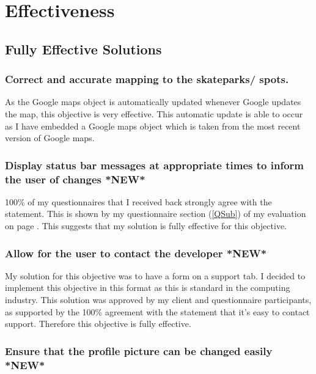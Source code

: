 \section{Effectiveness}

\subsection{Fully Effective Solutions}



	\subsubsection{Correct and accurate mapping to the skateparks/ spots.}

As the Google maps object is automatically updated whenever Google updates the map, this objective is very effective. This automatic update is able to occur as I have embedded a Google maps object which is taken from the most recent version of Google maps. 

	\subsubsection{Display status bar messages at appropriate times to inform the user of changes *NEW*}

100\% of my questionnaires that I received back strongly agree with the statement. This is shown by my questionnaire section (\ref{QSub}) of my evaluation on page \pageref{QSub}. This suggests that my solution is fully effective for this objective. 

	\subsubsection{Allow for the user to contact the developer *NEW*}

My solution for this objective was to have a form on a support tab. I decided to implement this objective in this format as this is standard in the computing industry. This solution was approved by my client and questionnaire participants, as supported by the 100\% agreement with the statement that it's easy to contact support. Therefore this objective is fully effective.

	\subsubsection{Ensure that the profile picture can be changed easily *NEW*}

